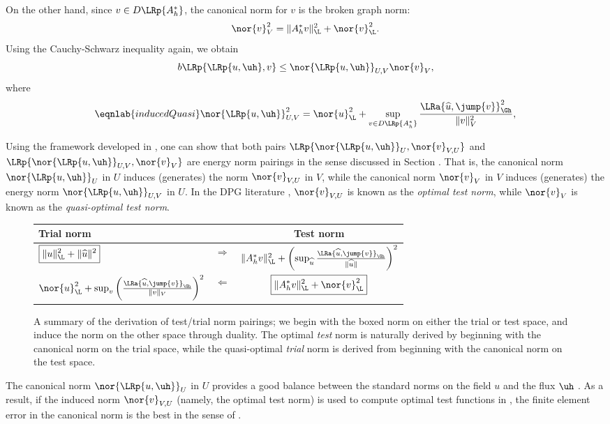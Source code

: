 On the other hand, since $v \in D\LRp{A^*_h}$, the canonical norm for
$v$ is the broken graph norm: 
\[
\nor{v}_V^2 =  \|A_h^*v\|_{\L}^2 + \nor{v}_{\L}^2.
\]
Using the Cauchy-Schwarz inequality again, we obtain
\[
b\LRp{\LRp{u,\uh},v} \le \nor{\LRp{u,\uh}}_{U,V} \nor{v}_{V},
\]
where
\begin{equation}
\eqnlab{inducedQuasi}
\nor{\LRp{u,\uh}}_{U,V}^2 = \nor{u}_{\L}^2
+\sup_{v \in D\LRp{A_h^*}} \frac{\LRa{\widehat{u},
  \jump{v}}_{\Gh}^2}{\|v\|_V^2},
\end{equation}

Using the framework developed in \cite{Bui-ThanhDemkowiczGhattas11a},
one can show that both pairs $\LRp{\nor{\LRp{u,\uh}}_U,
  \nor{v}_{V,U}}$ and $\LRp{\nor{\LRp{u,\uh}}_{U,V}, \nor{v}_{V}}$ are
energy norm pairings in the sense discussed in Section
. That is, the canonical norm $\nor{\LRp{u,\uh}}_U$
in $U$ induces (generates) the norm $\nor{v}_{V,U}$ in $V$, while the
canonical norm $\nor{v}_V$ in $V$ induces (generates) the energy norm
$\nor{\LRp{u,\uh}}_{U,V}$ in $U$. In the DPG literature \cite{DPG4}, $\nor{v}_{V,U}$ is known as the {\em optimal test norm},
while $\nor{v}_{V}$ is known as the {\em quasi-optimal test norm}.

\begin{figure}[!h]
\centering
\begin{tabular}{l c c}
Trial norm & & Test norm \\
\hline
$\boxed{\|u\|^2_{\L} + \|\widehat{u}\|^2}$ & $\Longrightarrow$  & $\|A_h^*v\|_{\L}^2
+\left(\sup_{\widehat{u}} \frac{\LRa{ \widehat{u},
  \jump{v} }_{\Gh}}{\|\widehat{u}\|}\right)^2$ \\
$\nor{u}_{\L}^2+\sup_{v } \left(\frac{\LRa{\widehat{u},
  \jump{v}}_{\Gh}}{\|v\|_V}\right)^2$ &  $\Longleftarrow$ & $\boxed{\|A_h^*v\|_{\L}^2 + \nor{v}_{\L}^2}$
\end{tabular}
\caption{A summary of the derivation of test/trial norm pairings; we begin with the boxed norm on either the trial or test space, and induce the norm on the other space through duality. The optimal \textit{test} norm is naturally derived by beginning with the canonical norm on the trial space, while the quasi-optimal \textit{trial} norm is derived from beginning with the canonical norm on the test space.}
\end{figure}

The canonical norm $\nor{\LRp{u,\uh}}_U$ in $U$ provides a good
balance between the standard norms on the field $u$ and the flux
$\uh$ \cite{DPG4}. As a result, if the induced norm $\nor{v}_{V,U}$ (namely, the
optimal test norm) is used to compute  optimal test functions in
, the finite element error in the canonical norm is the
best in the sense of . 

